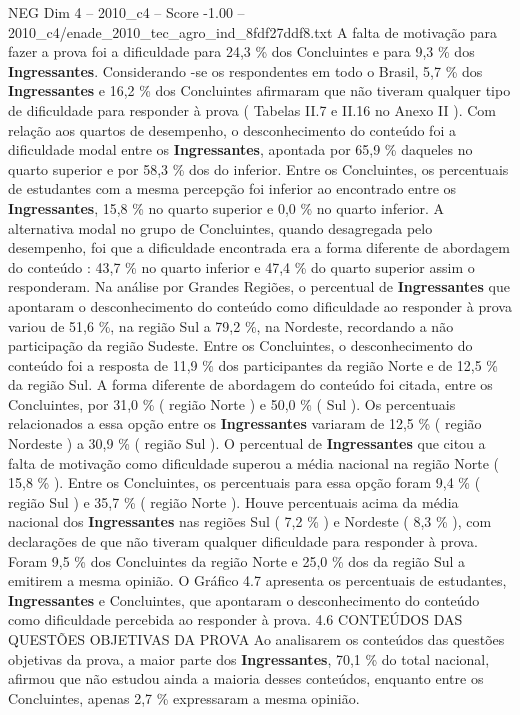 \begin{textsample}{NEG Dim 4 – 2010\_c4 – Score -1.00 – 2010\_c4/enade\_2010\_tec\_agro\_ind\_8fdf27ddf8.txt}
A falta de motivação para fazer a prova foi a dificuldade para 24,3 \% dos Concluintes e para 9,3 \% dos \textbf{Ingressantes}.
Considerando -se os respondentes em todo o Brasil, 5,7 \% dos \textbf{Ingressantes} e 16,2 \% dos Concluintes afirmaram que não tiveram qualquer tipo de dificuldade para responder à prova ( Tabelas II.7 e II.16 no Anexo II ).
Com relação aos quartos de desempenho, o desconhecimento do conteúdo foi a dificuldade modal entre os \textbf{Ingressantes}, apontada por 65,9 \% daqueles no quarto superior e por 58,3 \% dos do inferior.
Entre os Concluintes, os percentuais de estudantes com a mesma percepção foi inferior ao encontrado entre os \textbf{Ingressantes}, 15,8 \% no quarto superior e 0,0 \% no quarto inferior.
A alternativa modal no grupo de Concluintes, quando desagregada pelo desempenho, foi que a dificuldade encontrada era a forma diferente de abordagem do conteúdo : 43,7 \% no quarto inferior e 47,4 \% do quarto superior assim o responderam.
Na análise por Grandes Regiões, o percentual de \textbf{Ingressantes} que apontaram o desconhecimento do conteúdo como dificuldade ao responder à prova variou de 51,6 \%, na região Sul a 79,2 \%, na Nordeste, recordando a não participação da região Sudeste.
Entre os Concluintes, o desconhecimento do conteúdo foi a resposta de 11,9 \% dos participantes da região Norte e de 12,5 \% da região Sul.
A forma diferente de abordagem do conteúdo foi citada, entre os Concluintes, por 31,0 \% ( região Norte ) e 50,0 \% ( Sul ).
Os percentuais relacionados a essa opção entre os \textbf{Ingressantes} variaram de 12,5 \% ( região Nordeste ) a 30,9 \% ( região Sul ).
O percentual de \textbf{Ingressantes} que citou a falta de motivação como dificuldade superou a média nacional na região Norte ( 15,8 \% ).
Entre os Concluintes, os percentuais para essa opção foram 9,4 \% ( região Sul ) e 35,7 \% ( região Norte ).
Houve percentuais acima da média nacional dos \textbf{Ingressantes} nas regiões Sul ( 7,2 \% ) e Nordeste ( 8,3 \% ), com declarações de que não tiveram qualquer dificuldade para responder à prova.
Foram 9,5 \% dos Concluintes da região Norte e 25,0 \% dos da região Sul a emitirem a mesma opinião.
O Gráfico 4.7 apresenta os percentuais de estudantes, \textbf{Ingressantes} e Concluintes, que apontaram o desconhecimento do conteúdo como dificuldade percebida ao responder à prova. 4.6 CONTEÚDOS DAS QUESTÕES OBJETIVAS DA PROVA Ao analisarem os conteúdos das questões objetivas da prova, a maior parte dos \textbf{Ingressantes}, 70,1 \% do total nacional, afirmou que não estudou ainda a maioria desses conteúdos, enquanto entre os Concluintes, apenas 2,7 \% expressaram a mesma opinião.

\end{textsample}

